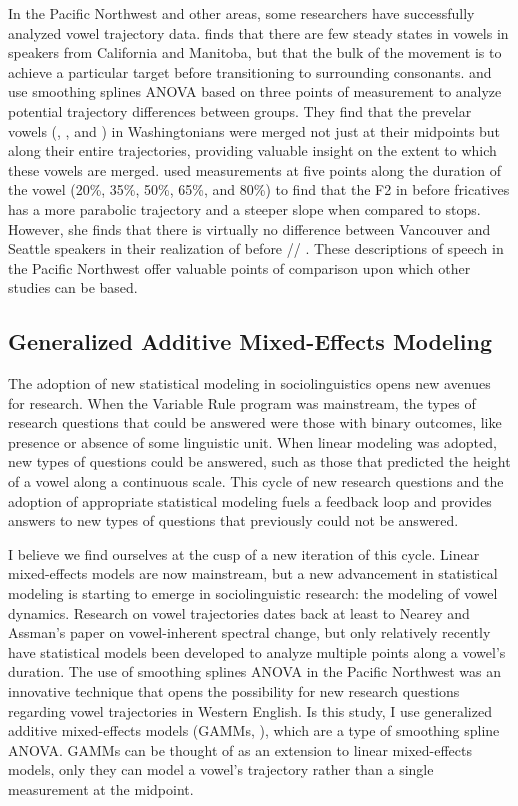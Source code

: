 In the Pacific Northwest and other areas, some researchers have successfully analyzed vowel trajectory data. \citet{hagiwara_2005} finds that there are few steady states in vowels in speakers from California and Manitoba, but that the bulk of the movement is to achieve a particular target before transitioning to surrounding consonants. \citet{freeman_2014} and \citet{riebold_2015_diss} use smoothing splines ANOVA based on three points of measurement to analyze potential trajectory differences between groups. They find that the prevelar vowels (\vague, \beg, and \bag) in Washingtonians were merged not just at their midpoints but along their entire trajectories, providing valuable insight on the extent to which these vowels are merged. \citet[162--163, 173]{swan_2016_diss} used measurements at five points along the duration of the vowel (20\%, 35\%, 50\%, 65\%, and 80\%) to find that the F2 in \trap before fricatives has a more parabolic trajectory and a steeper slope when compared to stops. However, she finds that there is virtually no difference between Vancouver and Seattle speakers in their realization of \trap before // \citeyearpar{swan_2016_proceedings}. These descriptions of speech in the Pacific Northwest offer valuable points of comparison upon which other studies can be based.

\subsection{Generalized Additive Mixed-Effects Modeling}
\label{gamms}

The adoption of new statistical modeling in sociolinguistics opens new avenues for research. When the Variable Rule program was mainstream, the types of research questions that could be answered were those with binary outcomes, like presence or absence of some linguistic unit. When linear modeling was adopted, new types of questions could be answered, such as those that predicted the height of a vowel along a continuous scale. This cycle of new research questions and the adoption of appropriate statistical modeling fuels a feedback loop and provides answers to new types of questions that previously could not be answered.

I believe we find ourselves at the cusp of a new iteration of this cycle. Linear mixed-effects models are now mainstream, but a new advancement in statistical modeling is starting to emerge in sociolinguistic research: the modeling of vowel dynamics. Research on vowel trajectories dates back at least to Nearey and Assman’s \citeyearpar{nearey_assman_1986} paper on vowel-inherent spectral change, but only relatively recently have statistical models been developed to analyze multiple points along a vowel's duration. The use of smoothing splines ANOVA in the Pacific Northwest was an innovative technique that opens the possibility for new research questions regarding vowel trajectories in Western English. Is this study, I use generalized additive mixed-effects models (GAMMs, \citealt{wood_2017}), which are a type of smoothing spline ANOVA. GAMMs can be thought of as an extension to linear mixed-effects models, only they can model a vowel's trajectory rather than a single measurement at the midpoint.

